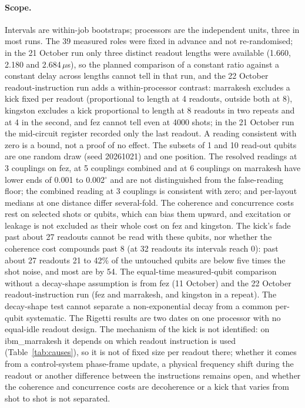 \documentclass[reprint,amsmath,amssymb,aps,superscriptaddress,nofootinbib]{revtex4-2}
\newcommand{\us}{\,$\mu$s}
\begin{document}
\paragraph*{Scope.} Intervals are within-job bootstraps; processors are the independent units, three in most runs. The 39 measured roles were fixed in advance and not re-randomised; in the 21 October run only three distinct readout lengths were available (1.660, 2.180 and 2.684\us), so the planned comparison of a constant ratio against a constant delay across lengths cannot tell in that run, and the 22 October readout-instruction run adds a within-processor contrast: marrakesh excludes a kick fixed per readout (proportional to length at 4 readouts, outside both at 8), kingston excludes a kick proportional to length at 8 readouts in two repeats and at 4 in the second, and fez cannot tell even at 4000 shots; in the 21 October run the mid-circuit register recorded only the last readout. A reading consistent with zero is a bound, not a proof of no effect. The subsets of 1 and 10 read-out qubits are one random draw (seed 20261021) and one position. The resolved readings at 3 couplings on fez, at 5 couplings combined and at 6 couplings on marrakesh have lower ends of 0.001 to 0.002$^\circ$ and are not distinguished from the false-reading floor; the combined reading at 3 couplings is consistent with zero; and per-layout medians at one distance differ several-fold. The coherence and concurrence costs rest on selected shots or qubits, which can bias them upward, and excitation or leakage is not excluded as their whole cost on fez and kingston. The kick's fade past about 27 readouts cannot be read with these qubits, nor whether the coherence cost compounds past 8 (at 32 readouts its intervals reach 0): past about 27 readouts 21 to 42\% of the untouched qubits are below five times the shot noise, and most are by 54. The equal-time measured-qubit comparison without a decay-shape assumption is from fez (11 October) and the 22 October readout-instruction run (fez and marrakesh, and kingston in a repeat). The decay-shape test cannot separate a non-exponential decay from a common per-qubit systematic. The Rigetti results are two dates on one processor with no equal-idle readout design. The mechanism of the kick is not identified: on ibm\_marrakesh it depends on which readout instruction is used (Table~\ref{tab:causes}), so it is not of fixed size per readout there; whether it comes from a control-system phase-frame update, a physical frequency shift during the readout or another difference between the instructions remains open, and whether the coherence and concurrence costs are decoherence or a kick that varies from shot to shot is not separated.
\end{document}
